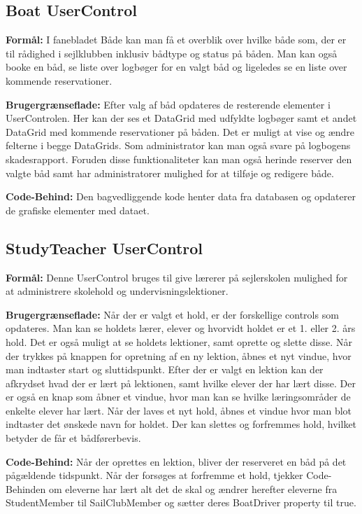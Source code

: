 \subsection{Boat UserControl}

\textbf{Formål:}
I fanebladet Både kan man få et overblik over hvilke både som, der er til rådighed i sejlklubben inklusiv bådtype og status på båden. 
Man kan også booke en båd, se liste over logbøger for en valgt båd og ligeledes se en liste over kommende reservationer. 

\textbf{Brugergrænseflade:}
Efter valg af båd opdateres de resterende elementer i UserControlen. 
Her kan der ses et DataGrid med udfyldte logbøger samt et andet DataGrid med kommende reservationer på båden.
Det er muligt at vise og ændre felterne i begge DataGrids.
Som administrator kan man også svare på logbogens skadesrapport.
Foruden disse funktionaliteter kan man også herinde reserver den valgte båd samt har administratorer mulighed for at tilføje og redigere både.

\textbf{Code-Behind:}
Den bagvedliggende kode henter data fra databasen og opdaterer de grafiske elementer med dataet. 


\subsection{StudyTeacher UserControl}

\textbf{Formål:}
Denne UserControl bruges til give lærerer på sejlerskolen mulighed for at administrere skolehold og undervisningslektioner.

\textbf{Brugergrænseflade:}
Når der er valgt et hold, er der forskellige controls som opdateres.
Man kan se holdets lærer, elever og hvorvidt holdet er et 1. eller 2. års hold. 
Det er også muligt at se holdets lektioner, samt oprette og slette disse.
Når der trykkes på knappen for opretning af en ny lektion, åbnes et nyt vindue, hvor man indtaster start og sluttidspunkt.
Efter der er valgt en lektion kan der afkrydset hvad der er lært på lektionen, samt hvilke elever der har lært disse.
Der er også en knap som åbner et vindue, hvor man kan se hvilke læringsområder de enkelte elever har lært.
Når der laves et nyt hold, åbnes et vindue hvor man blot indtaster det ønskede navn for holdet.
Der kan slettes og forfremmes hold, hvilket betyder de får et bådførerbevis.

\textbf{Code-Behind:}
Når der oprettes en lektion, bliver der reserveret en båd på det pågældende tidspunkt.
Når der forsøges at forfremme et hold, tjekker Code-Behinden om eleverne har lært alt det de skal og ændrer herefter eleverne fra StudentMember til SailClubMember og sætter deres BoatDriver property til true.

